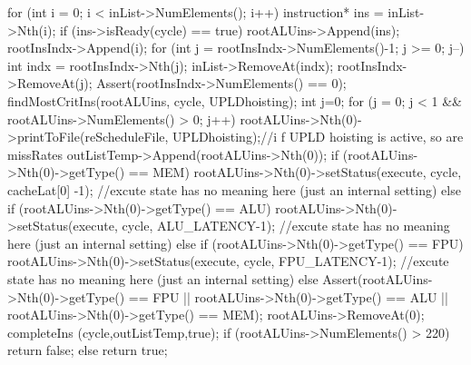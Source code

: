 \begin{DoxyCode}
                                                                                 
                                             {
        for (int i = 0; i < inList->NumElements(); i++) {
                instruction* ins = inList->Nth(i);
                if (ins->isReady(cycle) == true) {
                        rootALUins->Append(ins);
                        rootInsIndx->Append(i);
                }
        }
        for (int j = rootInsIndx->NumElements()-1; j >= 0; j--) {
                int indx = rootInsIndx->Nth(j);
                inList->RemoveAt(indx);
                rootInsIndx->RemoveAt(j);
        }
        Assert(rootInsIndx->NumElements() == 0);
        findMostCritIns(rootALUins, cycle, UPLDhoisting);
        int j=0;
        for (j = 0; j < 1 && rootALUins->NumElements() > 0; j++) {
                rootALUins->Nth(0)->printToFile(reScheduleFile, UPLDhoisting);//i
      f UPLD hoisting is active, so are missRates
                outListTemp->Append(rootALUins->Nth(0));
                if (rootALUins->Nth(0)->getType() == MEM) {
                        rootALUins->Nth(0)->setStatus(execute, cycle, cacheLat[0]
      -1); //excute state has no meaning here (just an internal setting)
                } else if (rootALUins->Nth(0)->getType() == ALU) {
                        rootALUins->Nth(0)->setStatus(execute, cycle, 
      ALU_LATENCY-1); //excute state has no meaning here (just an internal setting)
                } else if (rootALUins->Nth(0)->getType() == FPU) {
                        rootALUins->Nth(0)->setStatus(execute, cycle, 
      FPU_LATENCY-1); //excute state has no meaning here (just an internal setting)
                } else {
                        Assert(rootALUins->Nth(0)->getType() == FPU || 
                               rootALUins->Nth(0)->getType() == ALU || 
                               rootALUins->Nth(0)->getType() == MEM);
                }
                rootALUins->RemoveAt(0);
        }
        completeIns (cycle,outListTemp,true);
        if (rootALUins->NumElements() > 220)
                return false;
        else
                return true;
}
\end{DoxyCode}
